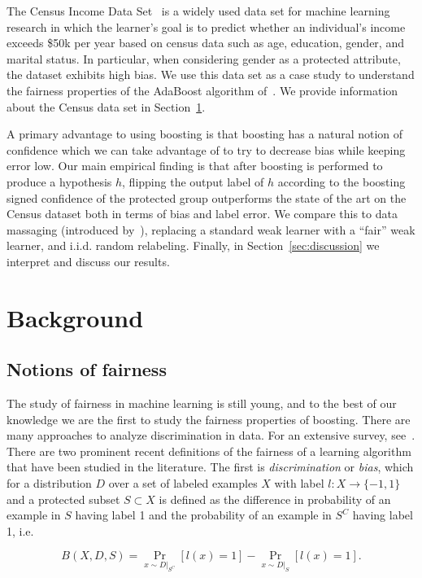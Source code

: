 \documentclass{article}
\begin{document}
The Census Income Data Set~\citep{UCIAdult} is a widely used data set for
machine learning research in which the learner's goal is to predict whether an
individual's income exceeds \$50k per year based on census data such as age,
education, gender, and marital status. In particular, when considering gender
as a protected attribute, the dataset exhibits high bias. We use this data set
as a case study to understand the fairness properties of the AdaBoost algorithm
of~\citet{FreundS97}. We provide information
about the Census data set in Section~\ref{sec:background}.

A primary advantage to using boosting is that boosting has a natural notion of
confidence which we can take advantage of to try to decrease bias while keeping
error low.  Our main empirical finding is that after boosting is performed to
produce a hypothesis $h$, flipping the output label of $h$ according to the
boosting signed confidence of the protected group outperforms the state of the art on the
Census dataset both in terms of bias and label error. We compare this to data
massaging (introduced by~\citet{KamiranC09}), replacing a standard weak learner
with a ``fair'' weak learner, and i.i.d. random relabeling. Finally, in
Section~\ref{sec:discussion} we interpret and discuss our results. 

\section{Background} \label{sec:background}

\subsection{Notions of fairness} The study of fairness in machine learning is
still young, and to the best of our knowledge we are the first to study the
fairness properties of boosting. There are many approaches to analyze
discrimination in data. For an extensive survey, see~\cite{RomeiR14}. There are
two prominent recent definitions of the fairness of a learning algorithm that
have been studied in the literature. The first is \emph{discrimination} or
\emph{bias}, which for a distribution $D$ over a set of labeled examples $X$
with label $l : X \to \{-1, 1\}$ and a protected subset $S \subset X$ is
defined as the difference in probability of an example in $S$ having label 1
and the probability of an example in $S^C$ having label 1, i.e.

$$ B(X, D, S) = \Pr_{x \sim D|_{S^C}}[l(x) = 1] - \Pr_{x \sim D|_{S}}
[l(x) = 1].$$
\end{document}
